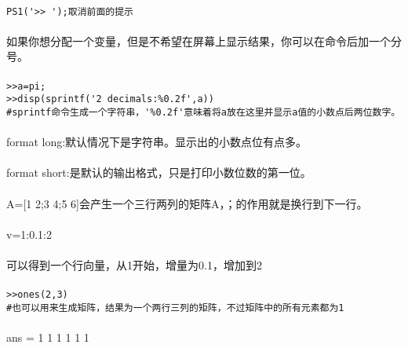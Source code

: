 \documentclass{article}
\begin{document}
\begin{CJK}{UTF8}{gbsn}
\paragraph{}
\begin{verbatim}
PS1('>> ');取消前面的提示
\end{verbatim}
\paragraph{}
如果你想分配一个变量，但是不希望在屏幕上显示结果，你可以在命令后加一个分号。
\paragraph{}
\begin{verbatim}
>>a=pi;
>>disp(sprintf('2 decimals:%0.2f',a))
#sprintf命令生成一个字符串，'%0.2f'意味着将a放在这里并显示a值的小数点后两位数字。
\end{verbatim}
\paragraph{}
format long:默认情况下是字符串。显示出的小数点位有点多。
\paragraph{}
format short:是默认的输出格式，只是打印小数位数的第一位。
\paragraph{}
A=[1 2;3 4;5 6]会产生一个三行两列的矩阵A，；的作用就是换行到下一行。
\paragraph{}
v=1:0.1:2
\paragraph{}
可以得到一个行向量，从1开始，增量为0.1，增加到2
\paragraph{}
\begin{verbatim}
>>ones(2,3)
#也可以用来生成矩阵，结果为一个两行三列的矩阵，不过矩阵中的所有元素都为1
\end{verbatim}
\paragraph{}
ans =
    1 1 1
    1 1 1

\end{CJK}
\end{document}
